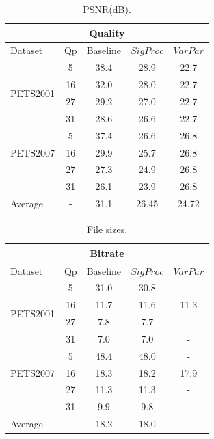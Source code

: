 \documentclass{article}
\begin{document}
\begin{table}
\centering
\begin{tabular}{|l|c|c|c|c|}
\hline
\multicolumn{5}{|c|}{Quality} \\
\hline
Dataset & Qp & Baseline & $SigProc$  & $VarPar$\\ 
\hline
\multirow{4}{*}{PETS2001} 
	&5 &38.4 &  28.9 &  22.7\\
	&16 &32.0 &  28.0 &  22.7\\
	&27 &29.2 &  27.0 &  22.7\\
	&31 &28.6 &  26.6 &  22.7\\
\hline
\multirow{3}{*}{PETS2007} 
	&5 &37.4 &  26.6 &  26.8\\
	&16 &29.9 &  25.7 &  26.8\\	
	&27 &27.3 &  24.9 &  26.8\\
	&31 &26.1 &  23.9 &  26.8\\
\hline
\multirow{1}{*}{Average}
& - & 31.1 & 26.45 & 24.72 \\ 
\hline
\end{tabular}
\caption{PSNR(dB).}
\label{tab:Quality}
\end{table}

\begin{table}
\centering
\begin{tabular}{|l|c|c|c|c|}
\hline
\multicolumn{5}{|c|}{Bitrate} \\
\hline
Dataset & Qp & Baseline & $SigProc$  & $VarPar$\\ 
\hline
\multirow{4}{*}{PETS2001} 
	&5 &31.0 &  30.8 &  -\\
	&16 &11.7 &  11.6 &  11.3\\
	&27 &7.8 &   7.7 &  -\\
	&31 &7.0 &   7.0 &  -\\
 \hline
 \multirow{3}{*}{PETS2007} 
	&5 &48.4 &  48.0 &  -\\
	&16 &18.3 &  18.2 &  17.9\\
	&27 &11.3 &  11.3 &  -\\
	&31 &9.9 &   9.8 &  -\\
\hline
\multirow{1}{*}{Average}
& - & 18.2 & 18.0 & - \\ 
\hline
\end{tabular}
\caption{File sizes.}
\label{tab:FileSize}
\end{table}
\end{document}
